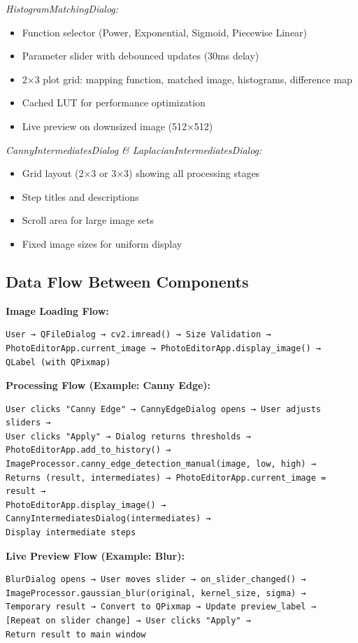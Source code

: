 \documentclass[12pt,a4paper]{article}
\begin{document}
\textit{HistogramMatchingDialog:}
\begin{itemize}
    \item Function selector (Power, Exponential, Sigmoid, Piecewise Linear)
    \item Parameter slider with debounced updates (30ms delay)
    \item 2×3 plot grid: mapping function, matched image, histograms, difference map
    \item Cached LUT for performance optimization
    \item Live preview on downsized image (512×512)
\end{itemize}

\textit{CannyIntermediatesDialog \& LaplacianIntermediatesDialog:}
\begin{itemize}
    \item Grid layout (2×3 or 3×3) showing all processing stages
    \item Step titles and descriptions
    \item Scroll area for large image sets
    \item Fixed image sizes for uniform display
\end{itemize}

\subsection{Data Flow Between Components}

\textbf{Image Loading Flow:}
\begin{verbatim}
User → QFileDialog → cv2.imread() → Size Validation →
PhotoEditorApp.current_image → PhotoEditorApp.display_image() →
QLabel (with QPixmap)
\end{verbatim}

\textbf{Processing Flow (Example: Canny Edge):}
\begin{verbatim}
User clicks "Canny Edge" → CannyEdgeDialog opens → User adjusts sliders →
User clicks "Apply" → Dialog returns thresholds →
PhotoEditorApp.add_to_history() →
ImageProcessor.canny_edge_detection_manual(image, low, high) →
Returns (result, intermediates) → PhotoEditorApp.current_image = result →
PhotoEditorApp.display_image() → CannyIntermediatesDialog(intermediates) →
Display intermediate steps
\end{verbatim}

\textbf{Live Preview Flow (Example: Blur):}
\begin{verbatim}
BlurDialog opens → User moves slider → on_slider_changed() →
ImageProcessor.gaussian_blur(original, kernel_size, sigma) →
Temporary result → Convert to QPixmap → Update preview_label →
[Repeat on slider change] → User clicks "Apply" →
Return result to main window
\end{verbatim}
\end{document}
